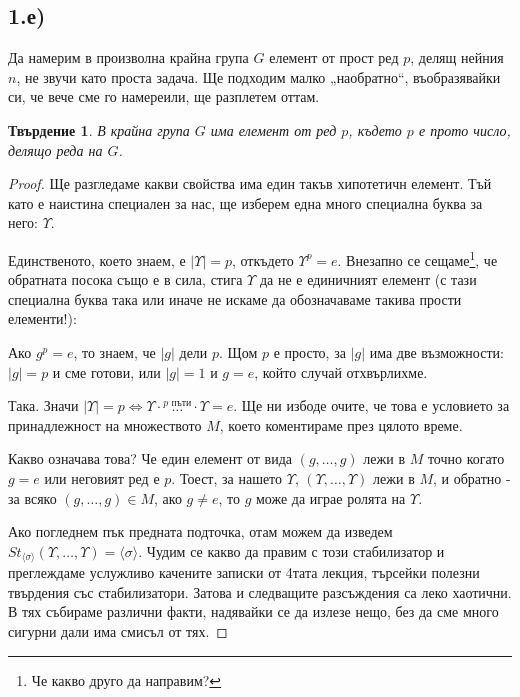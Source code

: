 \documentclass{article}
\newtheorem*{prop}{Твърдение}
\newcommand{\grsigma}[0]{{\langle \sigma \rangle}}
\begin{document}
\subsection*{1.е)}
Да намерим в произволна крайна група $G$ елемент от прост ред $p$, делящ нейния $n$, не звучи като проста задача. Ще подходим малко „наобратно“, въобразявайки си, че вече сме го намереили, ще разплетем оттам.

\begin{prop}
    В крайна група $G$ има елемент от ред $p$, където $p$ е прото число, делящо реда на $G$.
\end{prop}

\begin{proof}

    Ще разгледаме какви свойства има един такъв хипотетичн елемент.
    Тъй като е наистина специален за нас, ще изберем една много специална буква за него: $\Upsilon$.

    Единственото, което знаем, е $|\Upsilon| = p$, откъдето $\Upsilon^p = e$.
    Внезапно се сещаме\footnote{Че какво друго да направим?}, че обратната посока също е в сила, стига $\Upsilon$ да не е единичният елемент
    (с тази специална буква така или иначе не искаме да обозначаваме такива прости елементи!):

    Ако ${g^p = e}$, то знаем, че $|g|$ дели $p$.
    Щом $p$ е просто, за $|g|$ има две възможности: $|g| = p$ и сме готови, или $|g| = 1$ и $g = e$, който случай отхвърлихме.

    Така. Значи $|\Upsilon| = p \Longleftrightarrow \Upsilon \cdot \overset{p \textit{ пъти}}{\dots} \cdot \Upsilon = e$.
    Ще ни избоде очите, че това е условието за принадлежност на множеството $M$, което коментираме през цялото време.

    Какво означава това? Че един елемент от вида $(g, \dots, g)$ лежи в $M$ точно когато $g = e$ или неговият ред е $p$.
    Тоест, за нашето $\Upsilon$, $(\Upsilon, \dots, \Upsilon)$ лежи в $M$, и обратно - за всяко $(g, \dots, g) \in M$, ако $g \not= e$, то $g$ може да играе ролята на $\Upsilon$.

    Ако погледнем пък предната подточка, отам можем да изведем $St_{\grsigma}(\Upsilon, \dots, \Upsilon) = \grsigma$.
    Чудим се какво да правим с този стабилизатор и преглеждаме услужливо качените записки от 4тата лекция, търсейки полезни твърдения със стабилизатори.
    Затова и следващите разсъждения са леко хаотични. В тях събираме различни факти, надявайки се да излезе нещо, без да сме много сигурни дали има смисъл от тях.


\end{proof}
\end{document}
